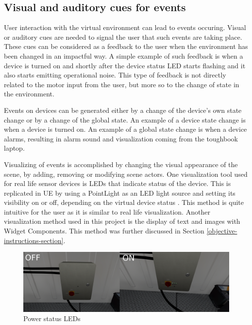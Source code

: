 \documentclass[12pt, a4paper,oneside, nocenter]{thesis}
\begin{document}
\subsection{Visual and auditory cues for events}
User interaction with the virtual environment can lead to events occuring. Visual or auditory cues are needed to signal the user that such events are taking place. These cues can be considered as a feedback to the user when the environment has been changed in an impactful way. A simple example of such feedback is when a device is turned on and shortly after the device status LED starts flashing and it also starts emitting operational noise. This type of feedback is not directly related to the motor input from the user, but more so to the change of state in the environment.
\par
Events on devices can be generated either by a change of the device's own state change or by a change of the global state. An example of a device state change is when a device is turned on. An example of a global state change is when a device alarms, resulting in alarm sound and visualization coming from the toughbook laptop.
\par
Visualizing of events is accomplished by changing the visual appearance of the scene, by adding, removing or modifying scene actors. One visualization tool used for real life sensor devices is LEDs that indicate status of the device. This is replicated in UE by using a PointLight as an LED light source and setting its visibility on or off, depending on the virtual device status . This method is quite intuitive for the user as it is similar to real life visualization. Another visualization method used in this project is the display of text and images with Widget Components. This method was further discussed in Section \ref{objective-instructions-section}.
\begin{figure}[H]
	\includegraphics[width=\textwidth]{visualizing-status}
	\caption{Power status LEDs}
	\label{fig:visualizing-status}
\end{figure}
\par
\end{document}

